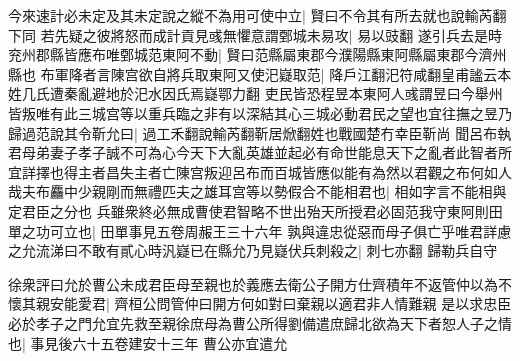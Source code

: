 今來速計必未定及其未定說之縱不為用可使中立|{
	賢曰不令其有所去就也說輸芮翻下同}
若先疑之彼將怒而成計貢見彧無懼意謂鄄城未易攻|{
	易以豉翻}
遂引兵去是時兖州郡縣皆應布唯鄄城范東阿不動|{
	賢曰范縣屬東郡今濮陽縣東阿縣屬東郡今濟州縣也}
布軍降者言陳宫欲自將兵取東阿又使汜嶷取范|{
	降戶江翻汜符咸翻皇甫謐云本姓几氏遭秦亂避地於汜水因氏焉嶷鄂力翻}
吏民皆恐程昱本東阿人彧謂昱曰今舉州皆叛唯有此三城宫等以重兵臨之非有以深結其心三城必動君民之望也宜往撫之昱乃歸過范說其令靳允曰|{
	過工禾翻說輸芮翻靳居焮翻姓也戰國楚冇幸臣靳尚}
聞呂布執君母弟妻子孝子誠不可為心今天下大亂英雄並起必有命世能息天下之亂者此智者所宜詳擇也得主者昌失主者亡陳宫叛迎呂布而百城皆應似能有為然以君觀之布何如人哉夫布麤中少親剛而無禮匹夫之雄耳宫等以勢假合不能相君也|{
	相如字言不能相與定君臣之分也}
兵雖衆終必無成曹使君智略不世出殆天所授君必固范我守東阿則田單之功可立也|{
	田單事見五卷周赧王三十六年}
孰與違忠從惡而母子俱亡乎唯君詳慮之允流涕曰不敢有貳心時汎嶷已在縣允乃見嶷伏兵刺殺之|{
	刺七亦翻}
歸勒兵自守

徐衆評曰允於曹公未成君臣母至親也於義應去衛公子開方仕齊積年不返管仲以為不懷其親安能愛君|{
	齊桓公問管仲曰開方何如對曰棄親以適君非人情難親}
是以求忠臣必於孝子之門允宜先救至親徐庶母為曹公所得劉備遣庶歸北欲為天下者恕人子之情也|{
	事見後六十五卷建安十三年}
曹公亦宜遣允

